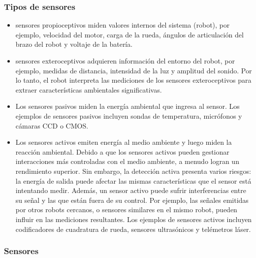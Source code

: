 \begin{frame}
    \frametitle{Tipos de sensores}

    \begin{itemize}
    \item sensores propioceptivos miden valores internos del sistema (robot), por ejemplo, velocidad del motor, carga de la rueda, ángulos de articulación del brazo del robot y voltaje de la batería.

    \item sensores exteroceptivos adquieren información del entorno del robot, por ejemplo, medidas de distancia, intensidad de la luz y amplitud del sonido. Por lo tanto, el robot interpreta las mediciones de los sensores exteroceptivos para extraer características ambientales significativas.
    \end{itemize}

    \begin{itemize}
    \item Los sensores pasivos miden la energía ambiental que ingresa al sensor. Los ejemplos de sensores pasivos incluyen sondas de temperatura, micrófonos y cámaras CCD o CMOS.

    \item Los sensores activos emiten energía al medio ambiente y luego miden la reacción ambiental. Debido a que los sensores activos pueden gestionar interacciones más controladas con el medio ambiente, a menudo logran un rendimiento superior. Sin embargo, la detección activa presenta varios riesgos: la energía de salida puede afectar las mismas características que el sensor está intentando medir. Además, un sensor activo puede sufrir interferencias entre su señal y las que están fuera de su control. Por ejemplo, las señales emitidas por otros robots cercanos, o sensores similares en el mismo robot, pueden influir en las mediciones resultantes. Los ejemplos de sensores activos incluyen codificadores de cuadratura de rueda, sensores ultrasónicos y telémetros láser.
\end{itemize}


\end{frame}


\begin{frame}
    \frametitle{Sensores}

\end{frame}

